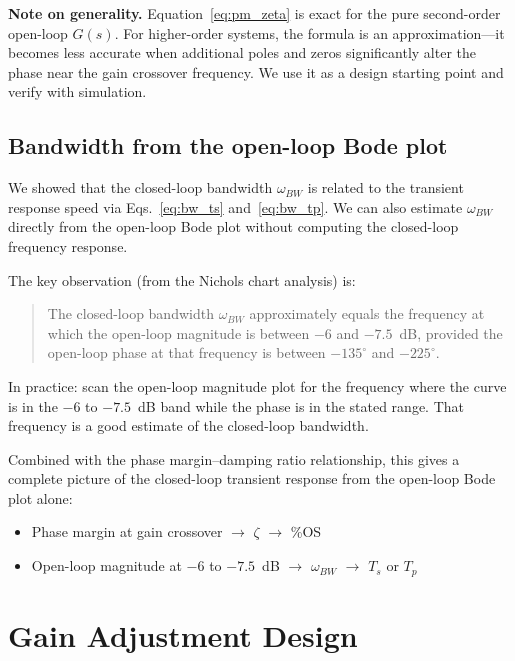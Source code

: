 \documentclass[../../book.tex]{subfiles}
\begin{document}
\medskip
\noindent\textbf{Note on generality.}  Equation~\eqref{eq:pm_zeta} is exact for the
pure second-order open-loop $G(s)$.  For higher-order systems, the formula is
an approximation---it becomes less accurate when additional poles and zeros
significantly alter the phase near the gain crossover frequency.  We use it as
a design starting point and verify with simulation.

\subsection{Bandwidth from the open-loop Bode plot}
\label{sec:bw_ol}

We showed that the closed-loop bandwidth $\omega_{BW}$ is related to the
transient response speed via Eqs.~\eqref{eq:bw_ts} and~\eqref{eq:bw_tp}.  We
can also estimate $\omega_{BW}$ directly from the open-loop Bode plot without
computing the closed-loop frequency response.

The key observation (from the Nichols chart analysis) is:

\begin{quote}
The closed-loop bandwidth $\omega_{BW}$ approximately equals the frequency
at which the open-loop magnitude is between $-6$ and $-7.5$~dB, provided the
open-loop phase at that frequency is between $-135^\circ$ and $-225^\circ$.
\end{quote}

In practice: scan the open-loop magnitude plot for the frequency where the
curve is in the $-6$ to $-7.5$~dB band while the phase is in the stated
range.  That frequency is a good estimate of the closed-loop bandwidth.

Combined with the phase margin--damping ratio relationship, this gives a
complete picture of the closed-loop transient response from the open-loop
Bode plot alone:
\begin{itemize}
  \item Phase margin at gain crossover $\rightarrow$ $\zeta$ $\rightarrow$ \%OS
  \item Open-loop magnitude at $-6$ to $-7.5$~dB $\rightarrow$ $\omega_{BW}$ $\rightarrow$ $T_s$ or $T_p$
\end{itemize}

\section{Gain Adjustment Design}
\label{sec:gain_design}
\end{document}
